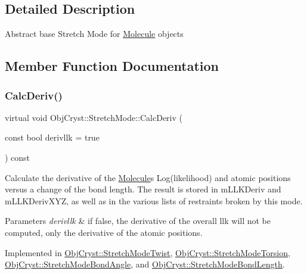 \subsection{Detailed Description}
Abstract base Stretch Mode for \mbox{\hyperlink{class_obj_cryst_1_1_molecule}{Molecule}} objects 

\subsection{Member Function Documentation}
\mbox{\label{struct_obj_cryst_1_1_stretch_mode_a5b5ab5f9819c047a49719a330722d419}} 
\subsubsection{\texorpdfstring{CalcDeriv()}{CalcDeriv()}}
{\footnotesize\ttfamily virtual void Obj\+Cryst\+::\+Stretch\+Mode\+::\+Calc\+Deriv (\begin{DoxyParamCaption}\item[{const bool}]{derivllk = {\ttfamily true} }\end{DoxyParamCaption}) const\hspace{0.3cm}{\ttfamily [pure virtual]}}

Calculate the derivative of the \mbox{\hyperlink{class_obj_cryst_1_1_molecule}{Molecule}}\textquotesingle{}s Log(likelihood) and atomic positions versus a change of the bond length. The result is stored in m\+L\+L\+K\+Deriv and m\+L\+L\+K\+Deriv\+X\+YZ, as well as in the various lists of restraints broken by this mode.


\begin{DoxyParams}{Parameters}
{\em derivllk} & if false, the derivative of the overall llk will not be computed, only the derivative of the atomic positions. \\
\hline
\end{DoxyParams}


Implemented in \mbox{\hyperlink{struct_obj_cryst_1_1_stretch_mode_twist_afbc57b887f9c886b3642d0b7368fd4ad}{Obj\+Cryst\+::\+Stretch\+Mode\+Twist}}, \mbox{\hyperlink{struct_obj_cryst_1_1_stretch_mode_torsion_af8e6659a98b089589e7485ff13e9eb66}{Obj\+Cryst\+::\+Stretch\+Mode\+Torsion}}, \mbox{\hyperlink{struct_obj_cryst_1_1_stretch_mode_bond_angle_a72c7ded6a3919b589dabbbd46c43671b}{Obj\+Cryst\+::\+Stretch\+Mode\+Bond\+Angle}}, and \mbox{\hyperlink{struct_obj_cryst_1_1_stretch_mode_bond_length_ab418eb610ae49059454ca1a2fe7fb9a3}{Obj\+Cryst\+::\+Stretch\+Mode\+Bond\+Length}}.



